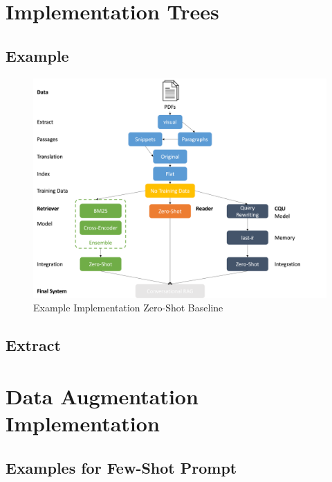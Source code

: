 \section{Implementation Trees}
\label{ref:appendixA-implementation}

\subsection{Example}

\begin{figure}
    \centering
    \includegraphics[width=\textwidth]{Grafiken/example_decission_tree.png}
    \caption{Example Implementation Zero-Shot Baseline}
    \label{fig:example-implementation-tree}
\end{figure}

\subsection{Extract}

\section{Data Augmentation Implementation}
\label{ref:appendixA-data-augmentation}

\subsection{Examples for Few-Shot Prompt}
\label{ref:appendixA-data-augmentation-few-shot-prompt}

